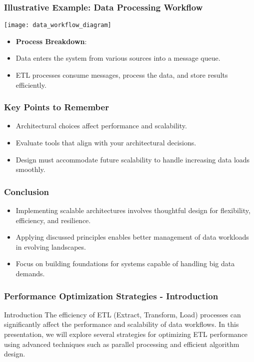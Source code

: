 \documentclass[aspectratio=169]{beamer}
\begin{document}
\begin{frame}[fragile]
    \frametitle{Illustrative Example: Data Processing Workflow}
    \begin{center}
        \texttt{[image: data\_workflow\_diagram]} %
    \end{center}
    \begin{itemize}
        \item \textbf{Process Breakdown}:
        \item Data enters the system from various sources into a message queue.
        \item ETL processes consume messages, process the data, and store results efficiently.
    \end{itemize}
\end{frame}

\begin{frame}[fragile]
    \frametitle{Key Points to Remember}
    \begin{itemize}
        \item Architectural choices affect performance and scalability.
        \item Evaluate tools that align with your architectural decisions.
        \item Design must accommodate future scalability to handle increasing data loads smoothly.
    \end{itemize}
\end{frame}

\begin{frame}[fragile]
    \frametitle{Conclusion}
    \begin{itemize}
        \item Implementing scalable architectures involves thoughtful design for flexibility, efficiency, and resilience.
        \item Applying discussed principles enables better management of data workloads in evolving landscapes.
        \item Focus on building foundations for systems capable of handling big data demands.
    \end{itemize}
\end{frame}

\begin{frame}[fragile]
    \frametitle{Performance Optimization Strategies - Introduction}
    \begin{block}{Introduction}
        The efficiency of ETL (Extract, Transform, Load) processes can significantly affect the performance and scalability of data workflows. 
        In this presentation, we will explore several strategies for optimizing ETL performance using advanced techniques such as parallel processing and efficient algorithm design.
    \end{block}
\end{frame}
\end{document}
